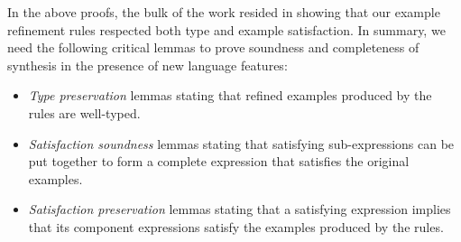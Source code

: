 In the above proofs, the bulk of the work resided in showing that our example refinement rules respected both type and example satisfaction.
In summary, we need the following critical lemmas to prove soundness and completeness of synthesis in the presence of new language features:
\begin{itemize}
  \item \emph{Type preservation} lemmas stating that refined examples produced by the  rules are well-typed.
  \item \emph{Satisfaction soundness} lemmas stating that satisfying sub-expressions can be put together to form a complete expression that satisfies the original examples.
  \item \emph{Satisfaction preservation} lemmas stating that a satisfying expression implies that its component expressions satisfy the examples produced by the  rules.
\end{itemize}
